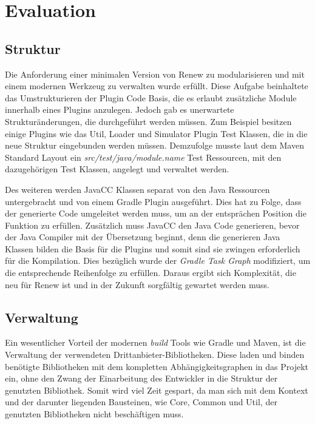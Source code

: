 \section{Evaluation}
\subsection{Struktur} \label{sub:struktur}
	Die Anforderung einer minimalen Version von Renew zu modularisieren und mit einem modernen Werkzeug zu verwalten wurde erfüllt. Diese Aufgabe beinhaltete das Umstrukturieren der Plugin Code Basis, die es erlaubt zusätzliche Module innerhalb eines Plugins anzulegen. Jedoch gab es unerwartete Strukturänderungen, die durchgeführt werden müssen. Zum Beispiel besitzen einige Plugins wie das Util, Loader und Simulator Plugin Test Klassen, die in die neue Struktur eingebunden werden müssen. Demzufolge musste laut dem Maven Standard Layout ein \textit{src/test/java/module.name} Test Ressourcen, mit den dazugehörigen Test Klassen, angelegt und verwaltet werden. \newline

	Des weiteren werden JavaCC Klassen separat von den Java Ressourcen untergebracht und von einem Gradle Plugin ausgeführt. Dies hat zu Folge, dass der generierte Code umgeleitet werden muss, um an der entsprächen Position die Funktion zu erfüllen. Zusätzlich muss JavaCC den Java Code generieren, bevor der Java Compiler mit der Übersetzung beginnt, denn die generieren Java Klassen bilden die Basis für die Plugins und somit sind sie zwingen erforderlich für die Kompilation. Dies bezüglich wurde der \textit{Gradle Task Graph} modifiziert, um die entsprechende Reihenfolge zu erfüllen. Daraus ergibt sich Komplexität, die neu für Renew ist und in der Zukunft sorgfältig gewartet werden muss. \bigbreak

\subsection{Verwaltung} \label{sub:verwaltung}
	Ein wesentlicher Vorteil der modernen \textit{build} Tools wie Gradle und Maven, ist die Verwaltung der verwendeten Drittanbieter-Bibliotheken. Diese laden und binden benötigte Bibliotheken mit dem kompletten Abhängigkeitsgraphen in das Projekt ein, ohne den Zwang der Einarbeitung des Entwickler in die Struktur der genutzten Bibliothek. Somit wird viel Zeit gespart, da man sich mit dem Kontext und der darunter liegenden Bausteinen, wie Core, Common und Util, der genutzten Bibliotheken nicht beschäftigen muss. \newline

